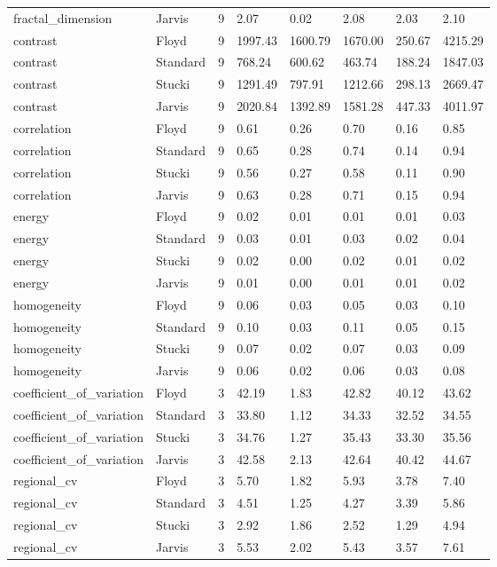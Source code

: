 \begin{tabular}{llrlllll}
fractal_dimension & Jarvis & 9 & 2.07 & 0.02 & 2.08 & 2.03 & 2.10 \\
contrast & Floyd & 9 & 1997.43 & 1600.79 & 1670.00 & 250.67 & 4215.29 \\
contrast & Standard & 9 & 768.24 & 600.62 & 463.74 & 188.24 & 1847.03 \\
contrast & Stucki & 9 & 1291.49 & 797.91 & 1212.66 & 298.13 & 2669.47 \\
contrast & Jarvis & 9 & 2020.84 & 1392.89 & 1581.28 & 447.33 & 4011.97 \\
correlation & Floyd & 9 & 0.61 & 0.26 & 0.70 & 0.16 & 0.85 \\
correlation & Standard & 9 & 0.65 & 0.28 & 0.74 & 0.14 & 0.94 \\
correlation & Stucki & 9 & 0.56 & 0.27 & 0.58 & 0.11 & 0.90 \\
correlation & Jarvis & 9 & 0.63 & 0.28 & 0.71 & 0.15 & 0.94 \\
energy & Floyd & 9 & 0.02 & 0.01 & 0.01 & 0.01 & 0.03 \\
energy & Standard & 9 & 0.03 & 0.01 & 0.03 & 0.02 & 0.04 \\
energy & Stucki & 9 & 0.02 & 0.00 & 0.02 & 0.01 & 0.02 \\
energy & Jarvis & 9 & 0.01 & 0.00 & 0.01 & 0.01 & 0.02 \\
homogeneity & Floyd & 9 & 0.06 & 0.03 & 0.05 & 0.03 & 0.10 \\
homogeneity & Standard & 9 & 0.10 & 0.03 & 0.11 & 0.05 & 0.15 \\
homogeneity & Stucki & 9 & 0.07 & 0.02 & 0.07 & 0.03 & 0.09 \\
homogeneity & Jarvis & 9 & 0.06 & 0.02 & 0.06 & 0.03 & 0.08 \\
coefficient_of_variation & Floyd & 3 & 42.19 & 1.83 & 42.82 & 40.12 & 43.62 \\
coefficient_of_variation & Standard & 3 & 33.80 & 1.12 & 34.33 & 32.52 & 34.55 \\
coefficient_of_variation & Stucki & 3 & 34.76 & 1.27 & 35.43 & 33.30 & 35.56 \\
coefficient_of_variation & Jarvis & 3 & 42.58 & 2.13 & 42.64 & 40.42 & 44.67 \\
regional_cv & Floyd & 3 & 5.70 & 1.82 & 5.93 & 3.78 & 7.40 \\
regional_cv & Standard & 3 & 4.51 & 1.25 & 4.27 & 3.39 & 5.86 \\
regional_cv & Stucki & 3 & 2.92 & 1.86 & 2.52 & 1.29 & 4.94 \\
regional_cv & Jarvis & 3 & 5.53 & 2.02 & 5.43 & 3.57 & 7.61 \\

\end{tabular}
